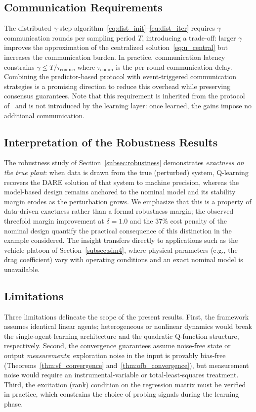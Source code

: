 \documentclass[12pt]{elsarticle}
\theoremstyle{remark}
\begin{document}
\subsection{Communication Requirements}
\label{subsec:communication}

The distributed $\gamma$-step algorithm~\eqref{eq:dist_init}--\eqref{eq:dist_iter} requires $\gamma$ communication rounds per sampling period $T$, introducing a trade-off: larger $\gamma$ improves the approximation of the centralized solution~\eqref{eq:u_central} but increases the communication burden. In practice, communication latency constrains $\gamma \leq T / \tau_{\mathrm{comm}}$, where $\tau_{\mathrm{comm}}$ is the per-round communication delay. Combining the predictor-based protocol with event-triggered communication strategies is a promising direction to reduce this overhead while preserving consensus guarantees. Note that this requirement is inherited from the protocol of~\cite{cacace2024} and is not introduced by the learning layer: once learned, the gains impose no additional communication.

\subsection{Interpretation of the Robustness Results}
\label{subsec:robust_disc}

The robustness study of Section~\ref{subsec:robustness} demonstrates \emph{exactness on the true plant}: when data is drawn from the true (perturbed) system, Q-learning recovers the DARE solution of that system to machine precision, whereas the model-based design remains anchored to the nominal model and its stability margin erodes as the perturbation grows. We emphasize that this is a property of data-driven exactness rather than a formal robustness margin; the observed threefold margin improvement at $\delta = 1.0$ and the 37\% cost penalty of the nominal design quantify the practical consequence of this distinction in the example considered. The insight transfers directly to applications such as the vehicle platoon of Section~\ref{subsec:sim4}, where physical parameters (e.g., the drag coefficient) vary with operating conditions and an exact nominal model is unavailable.

\subsection{Limitations}
\label{subsec:limitations}

Three limitations delineate the scope of the present results. First, the framework assumes identical linear agents; heterogeneous or nonlinear dynamics would break the single-agent learning architecture and the quadratic Q-function structure, respectively. Second, the convergence guarantees assume noise-free state or output \emph{measurements}; exploration noise in the input is provably bias-free (Theorems~\ref{thm:sf_convergence} and~\ref{thm:ofb_convergence}), but measurement noise would require an instrumental-variable or total-least-squares treatment. Third, the excitation (rank) condition on the regression matrix must be verified in practice, which constrains the choice of probing signals during the learning phase.
\end{document}
